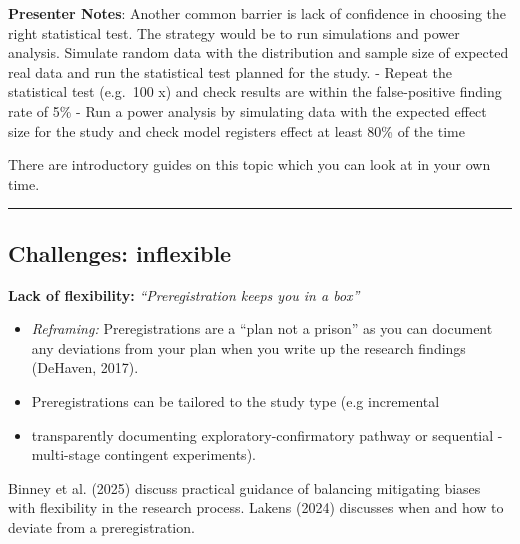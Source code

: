 \documentclass[
  letterpaper,
  DIV=11,
  numbers=noendperiod]{scrartcl}
\providecommand{\tightlist}{%
  \setlength{\itemsep}{0pt}\setlength{\parskip}{0pt}}
\begin{document}
\textbf{Presenter Notes}: Another common barrier is lack of confidence
in choosing the right statistical test. The strategy would be to run
simulations and power analysis. Simulate random data with the
distribution and sample size of expected real data and run the
statistical test planned for the study. - Repeat the statistical test
(e.g.~100 x) and check results are within the false-positive finding
rate of 5\% - Run a power analysis by simulating data with the expected
effect size for the study and check model registers effect at least 80\%
of the time

There are introductory guides on this topic which you can look at in
your own time.

\begin{center}\rule{0.5\linewidth}{0.5pt}\end{center}

\subsection{Challenges: inflexible}\label{challenges-inflexible}

\textbf{Lack of flexibility:} \emph{``Preregistration keeps you in a
box''}

\begin{itemize}
\tightlist
\item
  \emph{Reframing:} Preregistrations are a ``plan not a prison'' as you
  can document any deviations from your plan when you write up the
  research findings (DeHaven, 2017).
\item
  Preregistrations can be tailored to the study type (e.g incremental
\item
  transparently documenting exploratory-confirmatory pathway or
  sequential - multi-stage contingent experiments).
\end{itemize}

\begin{tcolorbox}[enhanced jigsaw, arc=.35mm, bottomrule=.15mm, bottomtitle=1mm, breakable, colback=white, colbacktitle=quarto-callout-note-color!10!white, colframe=quarto-callout-note-color-frame, coltitle=black, left=2mm, leftrule=.75mm, opacityback=0, opacitybacktitle=0.6, rightrule=.15mm, title=\textcolor{quarto-callout-note-color}{\faInfo}\hspace{0.5em}{Find out more}, titlerule=0mm, toprule=.15mm, toptitle=1mm]

Binney et al. (2025) discuss practical guidance of balancing mitigating
biases with flexibility in the research process. Lakens (2024) discusses
when and how to deviate from a preregistration.

\end{tcolorbox}
\end{document}
